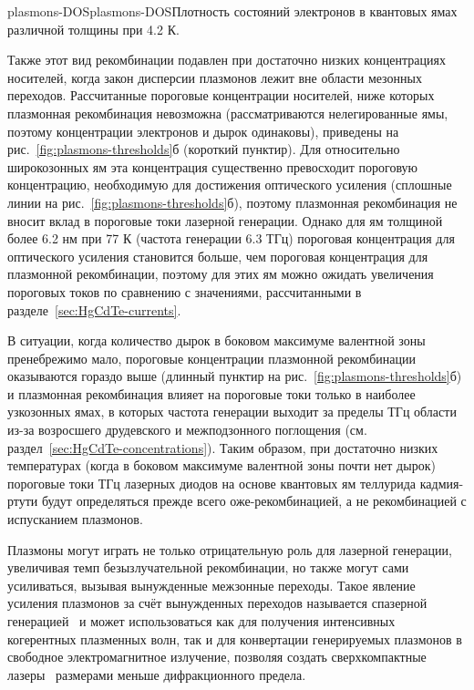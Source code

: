\begin{narrowfig}{plasmons-DOS}{plasmons-DOS}Плотность состояний электронов в квантовых ямах \HgCdTe{} различной толщины при 4.2 К.
\end{narrowfig}

Также этот вид рекомбинации подавлен при достаточно низких концентрациях носителей, когда закон дисперсии плазмонов лежит вне области мезонных переходов. Рассчитанные пороговые концентрации носителей, ниже которых плазмонная рекомбинация невозможна (рассматриваются нелегированные ямы, поэтому концентрации электронов и дырок одинаковы), приведены на рис.~\ref{fig:plasmons-thresholds}б (короткий пунктир). Для относительно широкозонных ям эта концентрация существенно превосходит пороговую концентрацию, необходимую для достижения оптического усиления (сплошные линии на рис.~\ref{fig:plasmons-thresholds}б), поэтому плазмонная рекомбинация не вносит вклад в пороговые токи лазерной генерации. Однако для ям толщиной более 6.2 нм при 77 К (частота генерации 6.3 ТГц) пороговая концентрация для оптического усиления становится больше, чем пороговая концентрация для плазмонной рекомбинации, поэтому для этих ям можно ожидать увеличения пороговых токов по сравнению с значениями, рассчитанными в разделе~\ref{sec:HgCdTe-currents}.

В ситуации, когда количество дырок в боковом максимуме валентной зоны пренебрежимо мало, пороговые концентрации плазмонной рекомбинации оказываются гораздо выше (длинный пунктир на рис.~\ref{fig:plasmons-thresholds}б) и плазмонная рекомбинация влияет на пороговые токи только в наиболее узкозонных ямах, в которых частота генерации выходит за пределы ТГц области из-за возросшего друдевского и межподзонного поглощения (см. раздел~\ref{sec:HgCdTe-concentrations}). Таким образом, при достаточно низких температурах (когда в боковом максимуме валентной зоны почти нет дырок) пороговые токи ТГц лазерных диодов на основе квантовых ям теллурида кадмия-ртути будут определяться прежде всего оже-рекомбинацией, а не рекомбинацией с испусканием плазмонов.

Плазмоны могут играть не только отрицательную роль для лазерной генерации, увеличивая темп безызлучательной рекомбинации, но также могут сами усиливаться, вызывая вынужденные межзонные переходы. Такое явление усиления плазмонов за счёт вынужденных переходов называется спазерной генерацией~\cite{spaser} и может использоваться как для получения интенсивных когерентных плазменных волн, так и для конвертации генерируемых плазмонов в свободное электромагнитное излучение, позволяя создать сверхкомпактные лазеры~\cite{subwavelength_spaser} размерами меньше дифракционного предела.

